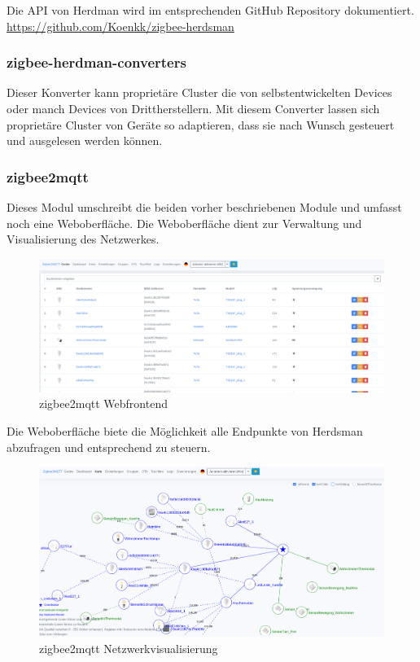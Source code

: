 Die API von Herdman wird im entsprechenden GitHub Repository dokumentiert.
\url{https://github.com/Koenkk/zigbee-herdsman}

\subsubsection{zigbee-herdman-converters}

Dieser Konverter kann proprietäre Cluster die von selbstentwickelten Devices oder manch Devices von Drittherstellern. Mit diesem Converter lassen sich proprietäre Cluster von Geräte
so adaptieren, dass sie nach Wunsch gesteuert und ausgelesen werden können.

\subsubsection{zigbee2mqtt}

Dieses Modul umschreibt die beiden vorher beschriebenen Module und umfasst noch eine Weboberfläche. Die Weboberfläche dient zur Verwaltung und Visualisierung des Netzwerkes.
\begin{figure}[H]
  \centering
  \includegraphics[width=1\textwidth]{media/z2m.png}
  \caption{zigbee2mqtt Webfrontend}
\end{figure}

Die Weboberfläche biete die Möglichkeit alle Endpunkte von Herdsman abzufragen und entsprechend zu steuern.

\begin{figure}[H]
  \centering
  \includegraphics[width=1\textwidth]{media/z2m-map.png}
  \caption{zigbee2mqtt Netzwerkvisualisierung}
\end{figure}


